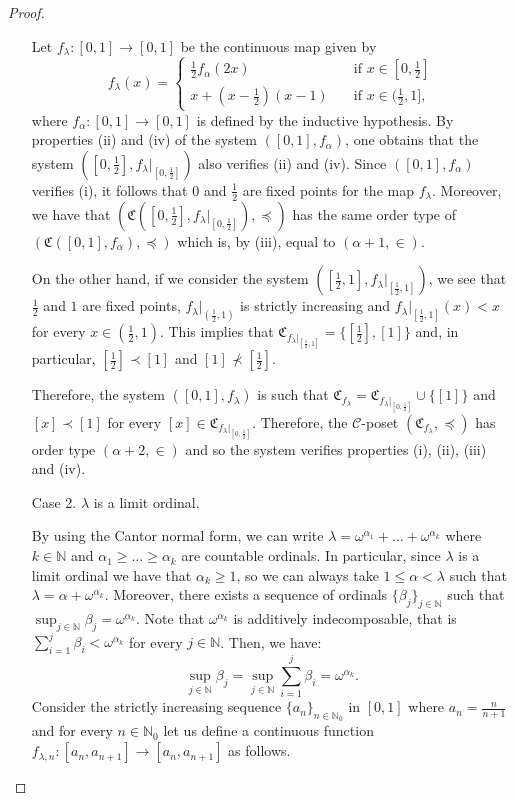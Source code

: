 \documentclass[pdflatex,sn-mathphys-num]{sn-jnl}
\theoremstyle{thmstyleone}%
\theoremstyle{thmstyletwo}%
\theoremstyle{thmstylethree}%
\begin{document}
\begin{proof}
\begin{itemize}
    Let $f_\lambda:[0,1]\rightarrow [0,1]$ be the continuous map given by
    \begin{equation*}
    f_\lambda(x)=\begin{cases}
        \frac{1}{2} f_\alpha (2x) & \quad\text{if }x\in [0,\frac{1}{2}]\\
        x+(x-\frac{1}{2})(x-1) & \quad\text{if }x\in (\frac{1}{2},1],
    \end{cases}
\end{equation*}
where $f_\alpha:[0,1]\to [0,1]$ is defined by the inductive hypothesis.
By properties (ii) and (iv) of the system $([0,1],f_\alpha)$, one obtains that the system $([0,\frac 1 2],f_\lambda |_{[0,\frac{1}{2}]})$ also verifies (ii) and (iv). 
Since $([0,1],f_\alpha)$ verifies (i), it follows that $0$ and $\frac 1 2$ are fixed points for the map $f_\lambda$.
Moreover, we have that $(\mathfrak{C}([0, \frac 1 2], f_\lambda |_{[0,\frac{1}{2}]}),\preceq)$ has the same order type of $(\mathfrak{C}([0,1],{f_\alpha}),\preceq)$ which is, by (iii), equal to $(\alpha+1,\in)$. 

On the other hand, if we consider the system $([\frac 1 2,1],f_\lambda |_{[\frac{1}{2},1]})$, we see that $\frac{1}{2}$ and $1$ are fixed points, $f_\lambda|_{(\frac{1}{2},1)}$ is strictly increasing and $f_\lambda|_{[\frac{1}{2},1]}(x)<x$ for every $x\in (\frac 1 2,1)$. 
This implies that 
$\mathfrak{C}_{f_\lambda |_{[\frac{1}{2},1]}}=\{ [\frac 1 2],[1] \}$ and, in particular, $[\frac{1}{2}]\prec [1]$ and $[1]\not\prec [\frac{1}{2}]$. 

Therefore, the system $([0,1],f_\lambda)$ is such that $\mathfrak{C}_{f_\lambda}=\mathfrak{C}_{f_\lambda |_{[0,\frac{1}{2}]}}\cup \{[1]\}$ and $[x]\prec [1]$ for every $[x]\in \mathfrak{C}_{f_\lambda |_{[0,\frac{1}{2}]}}$.
Therefore, the $\mathcal{C}$-poset $(\mathfrak{C}_{f_\lambda},\preceq)$ has order type $(\alpha+2,\in)$ and so the system verifies properties (i), (ii), (iii) and (iv). 

\item[Case 2.] $\lambda$ is a limit ordinal. 

By using the Cantor normal form, we can write $\lambda=\omega^{\alpha_1}+\ldots+\omega^{\alpha_k}$ where $k\in\mathbb{N}$ and $\alpha_1\ge \ldots\ge \alpha_k$ are countable ordinals. 
In particular, since $\lambda$ is a limit ordinal we have that $\alpha_k\ge1$, so we can always take $1\le \alpha<\lambda$ such that $\lambda=\alpha+\omega^{\alpha_k}$. 
Moreover, there exists a sequence of ordinals $\{\beta_j\}_{j\in\mathbb{N}}$ such that $\sup_{j\in\mathbb{N}}\beta_j=\omega^{\alpha_k}$.
Note that $\omega^{\alpha_k}$ is additively indecomposable, that is $\sum_{i=1}^j \beta_i<\omega^{\alpha_k}$ for every $j\in\mathbb{N}$. Then, we have:
\begin{equation}\label{prop_sup_ord}
  \sup_{j\in\mathbb{N}}\beta_j= \sup_{j\in\mathbb{N}}\sum_{i=1}^j \beta_i= \omega^{\alpha_k}.  
\end{equation}
Consider the strictly increasing sequence $\{a_n
\}_{n\in\mathbb{N}_0}$ in $[0,1]$ where $a_n=\frac{n}{n+1}$ and for every $n\in\mathbb{N}_0$ let us define a continuous function $f_{\lambda,n}:[a_n,a_{n+1}]\to [a_n,a_{n+1}]$ as follows.


\end{itemize}
\end{proof}
\end{document}
